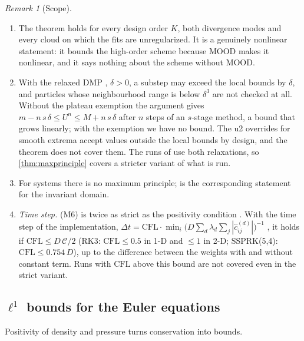 \documentclass[11pt,a4paper]{article}
\theoremstyle{plain}
\theoremstyle{definition}
\theoremstyle{remark}
\newtheorem{remark}[theorem]{Remark}
\numberwithin{equation}{section}
\newcommand{\Csp}{\mathcal{C}}
\newcommand{\CFL}{\mathrm{CFL}}
\newcommand{\A}[1]{\cite[#1]{Addendum}}
\begin{document}
\begin{remark}[Scope]\label{rem:maxprinciple}
\begin{enumerate}[label=(\roman*)]
\item The theorem holds for every design order $K$, both divergence modes and every cloud on which the fits are unregularized. It is a genuinely nonlinear statement: it bounds the high-order scheme because MOOD makes it nonlinear, and it says nothing about the scheme without MOOD.
\item With the relaxed DMP \A{(6.4)}, $\delta>0$, a substep may exceed the local bounds by $\delta$, and particles whose neighbourhood range is below $\delta^3$ are not checked at all. Without the plateau exemption the argument gives $m-n\,s\,\delta\le U^n\le M+n\,s\,\delta$ after $n$ steps of an $s$-stage method, a bound that grows linearly; with the exemption we have no bound. The u2 overrides for smooth extrema \cite{JungMUSCL2026} accept values outside the local bounds by design, and the theorem does not cover them. The runs of \cite{JungMUSCL2026} use both relaxations, so \cref{thm:maxprinciple} covers a stricter variant of what is run.
\item For systems there is no maximum principle; \A{Thm.~6.3} is the corresponding statement for the invariant domain.
\item \emph{Time step.} (M6) is twice as strict as the positivity condition \A{(5.1)}. With the time step of the implementation, $\Delta t=\CFL\cdot\min_i\big(D\sum_d\lambda_d\sum_j|\hat c^{(d)}_{ij}|\big)^{-1}$ \A{Rem.~6.5(iii)}, it holds if $\CFL\le D\,\Csp/2$ (RK3: $\CFL\le0.5$ in 1-D and $\le1$ in 2-D; SSPRK(5,4): $\CFL\le0.754\,D$), up to the difference between the weights with and without constant term. Runs with $\CFL$ above this bound are not covered even in the strict variant.
\end{enumerate}
\end{remark}

\subsection{\texorpdfstring{$\ell^1$}{l1} bounds for the Euler equations}

Positivity of density and pressure turns conservation into bounds.
\end{document}
